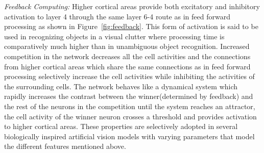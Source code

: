 \documentclass[12pt,twoside]{article}
\theoremstyle{plain}
\theoremstyle{definition}
\theoremstyle{remark}
\begin{document}
\textit{Feedback Computing: }Higher cortical areas provide both excitatory and inhibitory activation to layer 4 through the same layer 6-4 route as in feed forward processing as shown in Figure~\ref{fig:feedback}. This form of activation is said to be used in recognizing objects in a visual clutter where processing time is comparatively much higher than in unambiguous object recognition. Increased competition in the network decreases all the cell activities and the connections from higher cortical areas which share the same connections as in feed forward processing selectively increase the cell activities while inhibiting the activities of the surrounding cells. The network behaves like a dynamical system which rapidly increases the contrast between the winner(determined by feedback) and the rest of the neurons in the competition until the system reaches an attractor, the cell activity of the winner neuron crosses a threshold and provides activation to higher cortical areas. These properties are selectively adopted in several biologically inspired artificial vision models\cite{Fukushim1980}\cite{JimMutch2008}\cite{MarkusLessmann2014}\cite{NicolasPinto2008}\cite{ThomasSerre2007}\cite{XiaolinHu2014} with varying parameters that model the different features mentioned above.
\end{document}
